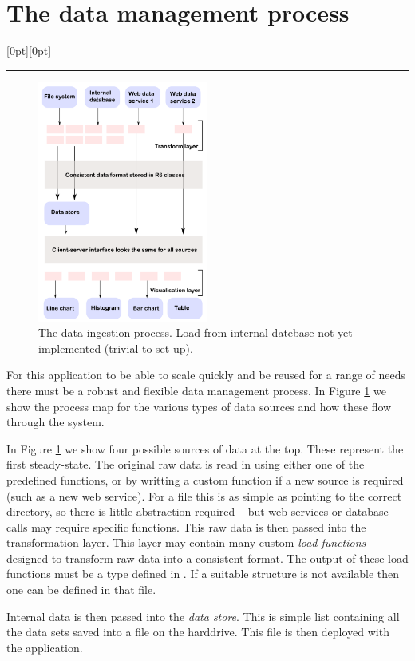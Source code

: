 \documentclass[12pt]{article}
\newcommand\statssection[1]{%
  \section{{#1}}
  \raisebox{1.5em}[0pt][0pt]{\textcolor{statsorange}{\rule{0.2\textwidth}{6pt}}}
}
\begin{document}
\clearpage
\statssection{The data management process}\label{sec:data}
\begin{figure}
\centering
\includegraphics[width=0.5\textwidth]{figures/data_process.pdf}
 	\caption{The data ingestion process.  Load from internal datebase not yet implemented (trivial to set up).}\label{fig:data_process}
\end{figure}
For this application to be able to scale quickly and be reused for a range of needs there must be a robust and flexible data management process.  In Figure \ref{fig:data_process} we show the process map for the various types of data sources and how these flow through the system.

In Figure \ref{fig:data_process} we show four possible sources of data at the top.  These represent the first steady-state.  The original raw data is read in using either one of the predefined functions, or by writting a custom function if a new source is required (such as a new web service).  For a file this is as simple as pointing to the correct directory, so there is little abstraction required -- but web services or database calls may require specific functions.  This raw data is then passed into the transformation layer.  This layer may contain many custom \textit{load functions} designed to transform raw data into a consistent format.  The output of these load functions must be a type defined in .  If a suitable structure is not available then one can be defined in that file.

Internal data is then passed into the \textit{data store}.  This is simple list containing all the data sets saved into a file on the harddrive.  This file is then deployed with the application.
\end{document}
